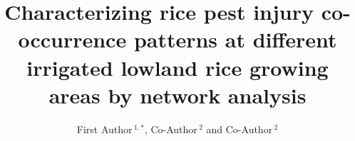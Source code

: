 \documentclass{frontiersSCNS} %
\def\firstAuthorLast{Sample {et~al.}} %
\def\Authors{First Author\,$^{1,*}$, Co-Author\,$^{2}$ and Co-Author\,$^2$}
\begin{document}
\onecolumn
{}

\title[Running Title]{Characterizing rice pest injury co-occurrence patterns at different irrigated lowland rice growing areas by network analysis} 

\author[\firstAuthorLast]{\Authors} %
\address{} %
\correspondance{} %

\extraAuth{}%


\maketitle

\end{document}
